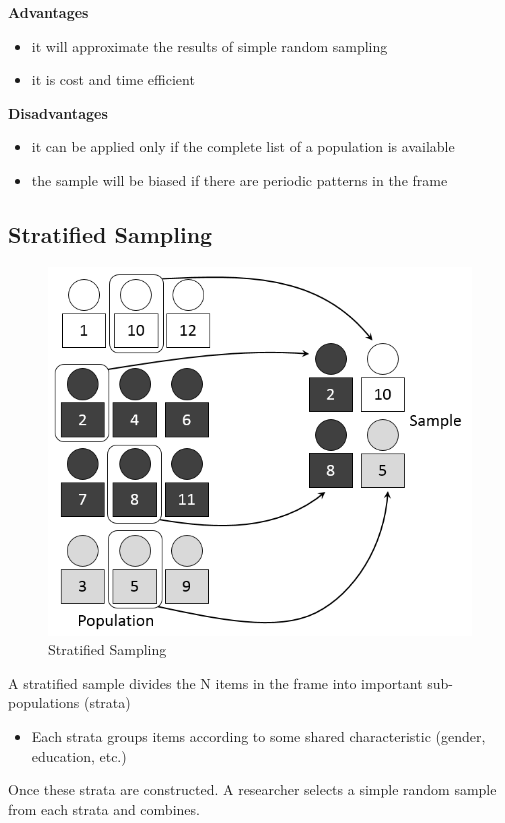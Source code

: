 \documentclass[
]{book}
\providecommand{\tightlist}{%
  \setlength{\itemsep}{0pt}\setlength{\parskip}{0pt}}
\begin{document}
\textbf{Advantages}

\begin{itemize}
\item
  it will approximate the results of simple random sampling
\item
  it is cost and time efficient
\end{itemize}

\textbf{Disadvantages}

\begin{itemize}
\item
  it can be applied only if the complete list of a population is available
\item
  the sample will be biased if there are periodic patterns in the frame
\end{itemize}

\subsection{Stratified Sampling}\label{stratified-sampling}

\begin{figure}

{\centering \includegraphics[width=0.5\linewidth]{images/Stratified} 

}

\caption{Stratified Sampling}\label{fig:unnamed-chunk-24}
\end{figure}

A stratified sample divides the N items in the frame into important sub-populations (strata)

\begin{itemize}
\tightlist
\item
  Each strata groups items according to some shared characteristic (gender, education, etc.)
\end{itemize}

Once these strata are constructed. A researcher selects a simple random sample from each strata and combines.
\end{document}
